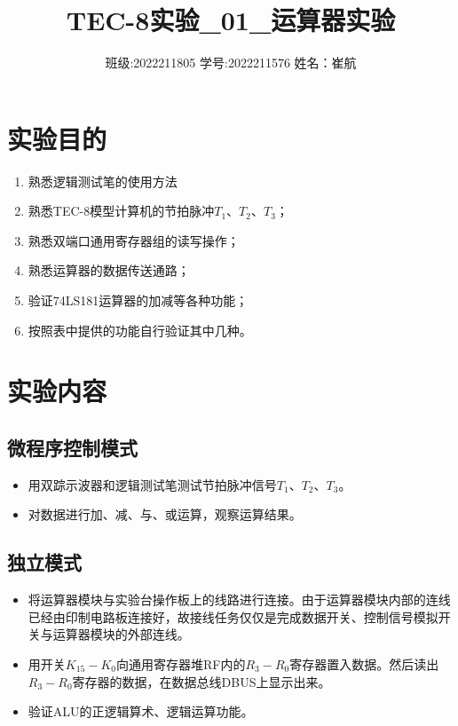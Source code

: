 \documentclass[a4paper]{article}
\title{\heiti\zihao{3} TEC-8实验\_01\_运算器实验}
\date{班级:2022211805  学号:2022211576  姓名：崔航}
\providecommand{\keywords}[1]
{
    \small	
    \textbf{关键词:} #1
}
\providecommand{\keywords}[1]
{
  \small	
  \textbf{关键词:} #1
}
\begin{document}
    \maketitle


\tableofcontents
\newpage 

\section{实验目的}
\begin{enumerate}
    
    \item 熟悉逻辑测试笔的使用方法
    \item 熟悉TEC-8模型计算机的节拍脉冲$T_1$、$T_2$、$T_3$；
    \item 熟悉双端口通用寄存器组的读写操作；
    \item 熟悉运算器的数据传送通路；
    \item 验证74LS181运算器的加减等各种功能；
    \item 按照表中提供的功能自行验证其中几种。
    
\end{enumerate}

\section{实验内容}
\subsection{微程序控制模式}
\begin{itemize}
    \item 用双踪示波器和逻辑测试笔测试节拍脉冲信号$T_1$、$T_2$、$T_3$。
    \item 对数据进行加、减、与、或运算，观察运算结果。
\end{itemize}
\subsection{独立模式}
\begin {itemize}
    \item 将运算器模块与实验台操作板上的线路进行连接。由于运算器模块内部的连线已经由印制电路板连接好，故接线任务仅仅是完成数据开关、控制信号模拟开关与运算器模块的外部连线。
    \item 用开关$K_{15}-K_{0}$向通用寄存器堆RF内的$R_3-R_0$寄存器置入数据。然后读出$R_3-R_0$寄存器的数据，在数据总线DBUS上显示出来。
    \item 验证ALU的正逻辑算术、逻辑运算功能。
    
\end{itemize}
\end{document}
